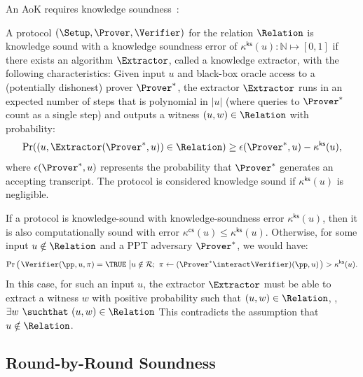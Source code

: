 An AoK requires knowledge soundness~\cite{crypto/AttemaCK21}:
\begin{definition}
	\label{def:knowledgeSoundness}
	A protocol $(\Setup, \Prover, \Verifier)$ for the relation $\Relation$ is knowledge sound with a knowledge soundness error of $\kappa^\mathsf{ks}(u)\colon \mathbb{N} \mapsto [0, 1]$ if there exists an algorithm $\Extractor$, called a knowledge extractor, with the following characteristics:
	Given input $u$ and black-box oracle access to a (potentially dishonest) prover $\Prover^*$, the extractor $\Extractor$ runs in an expected number of steps that is polynomial in $|u|$ (where queries to $\Prover^*$ count as a single step) and outputs a witness $ (u, w) \in \Relation$ with probability:
	\begin{equation*}
	\Pr((u, \Extractor(\Prover^*, u) ) \in \Relation )
	\ge
	\epsilon(\Prover^*, u) - \kappa^\mathsf{ks}(u),
	\end{equation*}
	where $\epsilon(\Prover^*, u)$ represents the probability that $\Prover^*$ generates an accepting transcript.
	The protocol is considered knowledge sound if $\kappa^\mathsf{ks}(u)$ is negligible.
\end{definition}

If a protocol is knowledge-sound with knowledge-soundness error
$\kappa^\mathsf{ks}(u)$, then it is also computationally sound with
error $\kappa^\mathsf{cs}(u) \le \kappa^\mathsf{ks}(u)$.
Otherwise, for some input $u \notin \Relation$ and a PPT adversary $\Prover^*$, we would have:
\[
	\Pr
	\left(
		\left.
		\begin{aligned}
			& \Verifier(\pp, u, \pi) = \TRUE \\
		\end{aligned}
		\right.
		\left|
		\begin{aligned}
			& u \notin \mathcal{R};~ \pi \leftarrow (\Prover^* \interact \Verifier)(\pp, u) \\
		\end{aligned}
		\right.
	\right)
	> \kappa^\mathsf{ks}(u).
\]
In this case, for such an input $u$, the extractor $\Extractor$ must be able to extract a witness $w$ with positive probability such that $(u, w) \in \Relation$,
\ie, $\exists w~\suchthat~(u, w) \in \Relation$
This contradicts the assumption that $u \notin \Relation$.


\subsection{Round-by-Round Soundness}
\label{appx:rbyDef}

